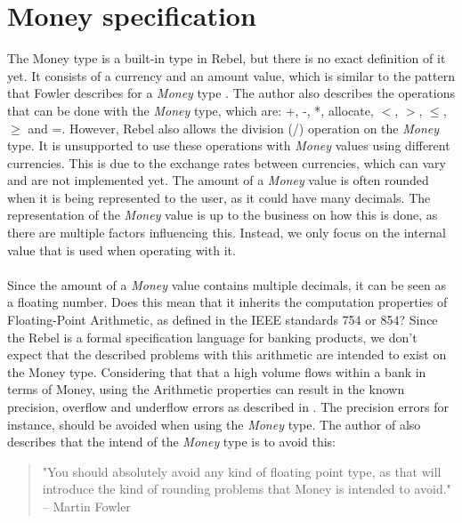 \section{Money specification}
The Money type is a built-in type in Rebel, but there is no exact definition of it yet. It consists of a currency and an amount value, which is similar to the pattern that Fowler describes for a \textit{Money} type \cite{fowler2002patterns}. The author also describes the operations that can be done with the \textit{Money} type, which are: +, -, *, allocate, $<$, $>$, $\leq$, $\geq$ and =. However, Rebel also allows the division (/) operation on the \textit{Money} type.  It is unsupported to use these operations with \textit{Money} values using different currencies. This is due to the exchange rates between currencies, which can vary and are not implemented yet. The amount of a \textit{Money} value is often rounded when it is being represented to the user, as it could have many decimals. The representation of the \textit{Money} value is up to the business on how this is done, as there are multiple factors influencing this. Instead, we only focus on the internal value that is used when operating with it.\\
\\
Since the amount of a \textit{Money} value contains multiple decimals, it can be seen as a floating number. Does this mean that it inherits the computation properties of Floating-Point Arithmetic, as defined in the IEEE standards 754 or 854? Since the Rebel is a formal specification language for banking products, we don't expect that the described problems with this arithmetic are intended to exist on the Money type. Considering that that a high volume flows within a bank in terms of Money, using the Arithmetic properties can result in the known precision, overflow and underflow errors as described in \cite{goldberg1991every}. The precision errors for instance, should be avoided when using the \textit{Money} type. The author of \cite{fowler2002patterns} also describes that the intend of the \textit{Money} type is to avoid this:
\begin{quote}
	"You should absolutely avoid any kind of floating point type, as that will introduce the kind of rounding problems that Money is intended to avoid." 
    -- Martin Fowler \cite{fowler2002patterns} %
\end{quote}
